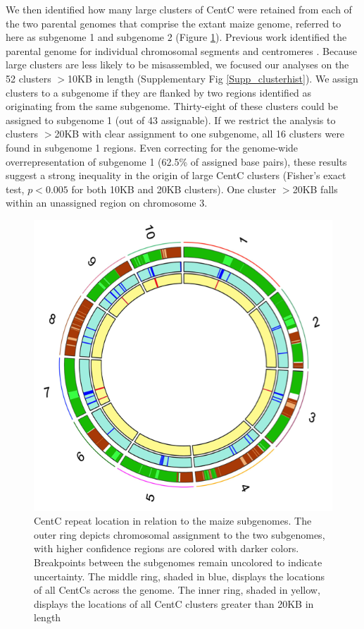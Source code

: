 We then identified how many large clusters of CentC were retained from each of the two parental genomes that comprise the extant maize genome, referred to here as subgenome 1 and subgenome 2 (Figure \ref{circos}).  Previous work identified the parental genome for individual chromosomal segments \citep{Schnable2011} and centromeres \citep{Wang2012}.  Because large clusters are less likely to be misassembled, we focused our analyses on the 52 clusters $>$10KB in length (Supplementary Fig \ref{Supp_clusterhist}).  We assign clusters to a subgenome if they are flanked by two regions identified as originating from the same  subgenome.  Thirty-eight of these clusters could be assigned to subgenome 1 (out of 43 assignable). If we restrict the analysis to clusters  $>$20KB with clear assignment to one subgenome, all 16 clusters were found in subgenome 1 regions.  Even correcting for the genome-wide overrepresentation of subgenome 1 (62.5\% of assigned base pairs), these results suggest a strong inequality in the origin of large CentC clusters (Fisher's exact test, $p<0.005$ for both 10KB and 20KB clusters).  One cluster $>$20KB falls within an unassigned region on chromosome 3.

\begin{figure}
\includegraphics{Fig1_circos}
\caption{CentC repeat location in relation to the maize subgenomes.  The outer ring depicts chromosomal assignment to the two subgenomes, with higher confidence regions are colored with darker colors.  Breakpoints between the subgenomes remain uncolored to indicate uncertainty. The middle ring, shaded in blue, displays the locations of all CentCs across the genome.  The inner ring, shaded in yellow, displays the locations of all CentC clusters greater than 20KB in length}
\label{circos}    
\end{figure}

